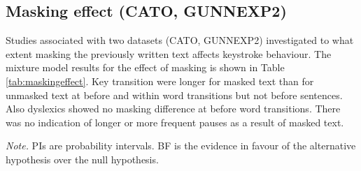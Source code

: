 \clearpage
\makeatletter
\efloat@restorefloats
\makeatother


\begin{appendix}
\section{}
\hypertarget{masking-effect-cato-gunnexp2}{%
\subsection{Masking effect (CATO,
GUNNEXP2)}\label{masking-effect-cato-gunnexp2}}

Studies associated with two datasets (CATO, GUNNEXP2) investigated to
what extent masking the previously written text affects keystroke
behaviour. The mixture model results for the effect of masking is shown
in Table \ref{tab:maskingeffect}. Key transition were longer for masked
text than for unmasked text at before and within word transitions but
not before sentences. Also dyslexics showed no masking difference at
before word transitions. There was no indication of longer or more
frequent pauses as a result of masked text.

\blandscape

\begin{center}
\begin{ThreePartTable}

\begin{TableNotes}[para]
\normalsize{\textit{Note.} PIs are probability intervals. BF is the evidence in favour of the alternative hypothesis over the null hypothesis.}
\end{TableNotes}

\footnotesize{

}
\end{ThreePartTable}
\end{center}
\end{appendix}
